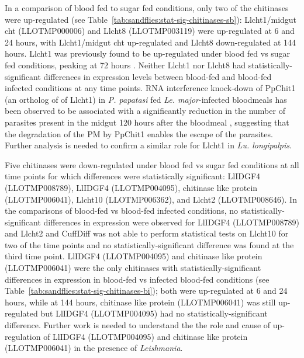 In a comparison of blood fed to sugar fed conditions, only two of the chitinases were up-regulated (see Table~\ref{tab:sandflies:stat-sig-chitinases-sb}): Llcht1/midgut cht (LLOTMP000006) and Llcht8 (LLOTMP003119) were up-regulated at 6 and 24 hours, with Llcht1/midgut cht up-regulated and Llcht8 down-regulated at 144 hours.  Llcht1 was previously found to be up-regulated under blood fed vs sugar fed conditions, peaking at 72 hours \cite{Ramalho-Ortigao2003}. Neither Llcht1 nor Llcht8 had statistically-significant differences in expression levels between blood-fed and blood-fed infected conditions at any time points. RNA interference knock-down of PpChit1 (an ortholog of of Llcht1) in \emph{P. papatasi} fed \emph{Le. major}-infected bloodmeals has been observed to be associated with a significantly reduction in the number of parasites present in the midgut 120 hours after the bloodmeal \cite{Coutinho-abreu2010}, suggesting that the degradation of the PM by PpChit1 enables the escape of the parasites.  Further analysis is needed to confirm a similar role for Llcht1 in \emph{Lu. longipalpis}. 

Five chitinases were down-regulated under blood fed vs sugar fed conditions at all time points for which differences were statistically significant: LlIDGF4 (LLOTMP008789), LlIDGF4 (LLOTMP004095), chitinase like protein (LLOTMP006041), Llcht10 (LLOTMP006362), and Llcht2 (LLOTMP008646).  In the comparisons of blood-fed vs blood-fed infected conditions, no statistically-significant differences in expression were observed for LlIDGF4 (LLOTMP008789) and Llcht2 and CuffDiff was not able to perform statistical tests on Llcht10 for two of the time points and no statistically-significant difference was found at the third time point. LlIDGF4 (LLOTMP004095) and chitinase like protein (LLOTMP006041) were the only chitinases with statistically-significant differences in expression in blood-fed vs infected blood-fed conditions (see Table~\ref{tab:sandflies:stat-sig-chitinases-bi}); both were up-regulated at 6 and 24 hours, while at 144 hours, chitinase like protein (LLOTMP006041) was still up-regulated but LlIDGF4 (LLOTMP004095) had no statistically-significant difference. Further work is needed to understand the the role and cause of up-regulation of LlIDGF4 (LLOTMP004095) and chitinase like protein (LLOTMP006041) in the presence of \emph{Leishmania}.

